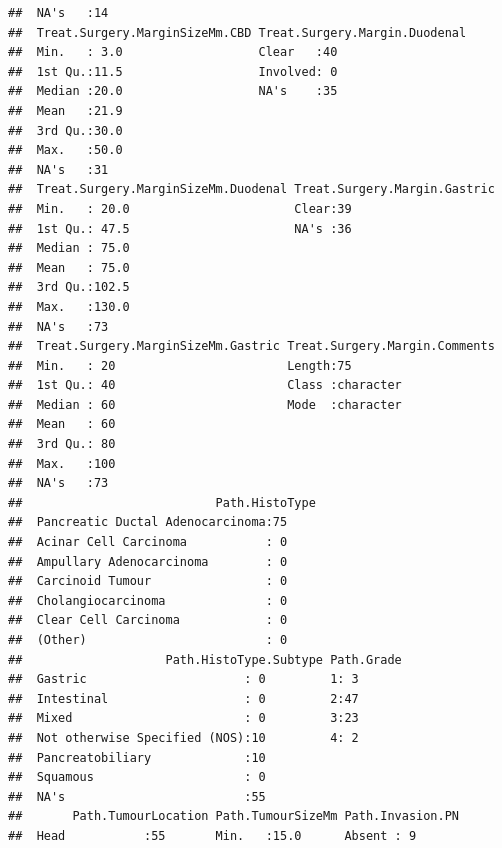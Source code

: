 \documentclass{article}\usepackage[]{graphicx}\usepackage[]{color}
\makeatletter
\newenvironment{kframe}{%
 \def\at@end@of@kframe{}%
 \ifinner\ifhmode%
  \def\at@end@of@kframe{\end{minipage}}%
  \begin{minipage}{\columnwidth}%
 \fi\fi%
 \def\FrameCommand##1{\hskip\@totalleftmargin \hskip-\fboxsep
 \colorbox{shadecolor}{##1}\hskip-\fboxsep
     \hskip-\linewidth \hskip-\@totalleftmargin \hskip\columnwidth}%
 \MakeFramed {\advance\hsize-\width
   \@totalleftmargin\z@ \linewidth\hsize
   \@setminipage}}%
 {\par\unskip\endMakeFramed%
 \at@end@of@kframe}
\newenvironment{knitrout}{}{} %
\makeatother
\begin{document}
\begin{knitrout}
\begin{kframe}
\begin{verbatim}
##  NA's   :14                                                
##  Treat.Surgery.MarginSizeMm.CBD Treat.Surgery.Margin.Duodenal
##  Min.   : 3.0                   Clear   :40                  
##  1st Qu.:11.5                   Involved: 0                  
##  Median :20.0                   NA's    :35                  
##  Mean   :21.9                                                
##  3rd Qu.:30.0                                                
##  Max.   :50.0                                                
##  NA's   :31                                                  
##  Treat.Surgery.MarginSizeMm.Duodenal Treat.Surgery.Margin.Gastric
##  Min.   : 20.0                       Clear:39                    
##  1st Qu.: 47.5                       NA's :36                    
##  Median : 75.0                                                   
##  Mean   : 75.0                                                   
##  3rd Qu.:102.5                                                   
##  Max.   :130.0                                                   
##  NA's   :73                                                      
##  Treat.Surgery.MarginSizeMm.Gastric Treat.Surgery.Margin.Comments
##  Min.   : 20                        Length:75                    
##  1st Qu.: 40                        Class :character             
##  Median : 60                        Mode  :character             
##  Mean   : 60                                                     
##  3rd Qu.: 80                                                     
##  Max.   :100                                                     
##  NA's   :73                                                      
##                           Path.HistoType
##  Pancreatic Ductal Adenocarcinoma:75    
##  Acinar Cell Carcinoma           : 0    
##  Ampullary Adenocarcinoma        : 0    
##  Carcinoid Tumour                : 0    
##  Cholangiocarcinoma              : 0    
##  Clear Cell Carcinoma            : 0    
##  (Other)                         : 0    
##                    Path.HistoType.Subtype Path.Grade
##  Gastric                      : 0         1: 3      
##  Intestinal                   : 0         2:47      
##  Mixed                        : 0         3:23      
##  Not otherwise Specified (NOS):10         4: 2      
##  Pancreatobiliary             :10                   
##  Squamous                     : 0                   
##  NA's                         :55                   
##       Path.TumourLocation Path.TumourSizeMm Path.Invasion.PN
##  Head           :55       Min.   :15.0      Absent : 9      

\end{verbatim}
\end{kframe}
\end{knitrout}
\end{document}
